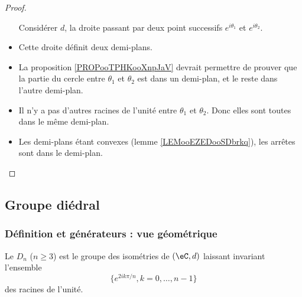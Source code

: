 \begin{proof}
\begin{subproof}
\begin{itemize}
			      Considérer \( d\),  la droite passant par deux point successifs \(  e^{i\theta_1}\) et \(  e^{i\theta_2}\).
			\item
			      Cette droite définit deux demi-plans.
			\item
			      La proposition \ref{PROPooTPHKooXnpJaV} devrait permettre de prouver que la partie du cercle entre \( \theta_1\) et \( \theta_2\) est dans un demi-plan, et le reste dans l'autre demi-plan.
			\item
			      Il n'y a pas d'autres racines de l'unité entre \( \theta_1\) et \( \theta_2\). Donc elles sont toutes dans le même demi-plan.
			\item
			      Les demi-plans étant convexes (lemme \ref{LEMooEZEDooSDbrkq}), les arrêtes sont dans le demi-plan.
		\end{itemize}
	\end{subproof}
\end{proof}


\subsection{Groupe diédral}


\subsubsection{Définition et générateurs : vue géométrique}

\begin{definition}  \label{DEFooIWZGooAinSOh}
	Le  \( D_n\) (\( n\geq 3\)) est le groupe des isométries de \( (\eC,d)\) laissant invariant l'ensemble
	\begin{equation}
		\{  e^{2ik\pi/n},k=0,\ldots, n-1 \}
	\end{equation}
	des racines de l'unité.
\end{definition}

